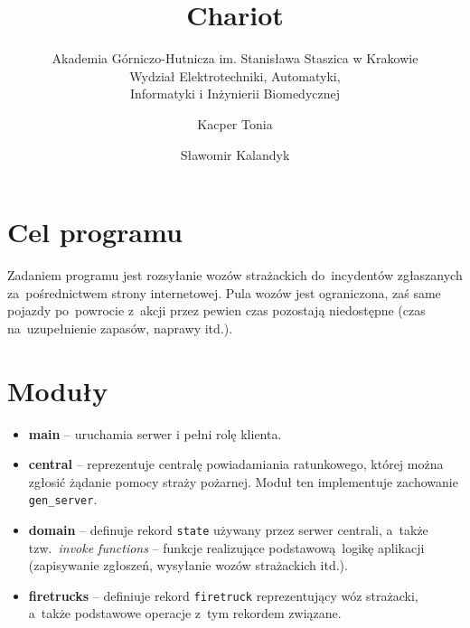 \documentclass{article}
\title{Chariot}
\subtitle{Akademia Górniczo-Hutnicza im. Stanisława Staszica w Krakowie\\
	Wydział Elektrotechniki, Automatyki,\\
	Informatyki i Inżynierii Biomedycznej}
\author{Kacper Tonia\and
		Sławomir Kalandyk}
\date{}
\begin{document}
\maketitle

\section{Cel programu}
Zadaniem programu jest rozsyłanie wozów strażackich do~incydentów zgłaszanych za~pośrednictwem strony internetowej. Pula wozów jest ograniczona, zaś same pojazdy po~powrocie z~akcji przez pewien czas pozostają niedostępne (czas na~uzupełnienie zapasów, naprawy itd.).
\section{Moduły}
\begin{itemize}
	\item \textbf{main} -- uruchamia serwer i pełni rolę klienta.
	\item \textbf{central} -- reprezentuje centralę powiadamiania ratunkowego, której można zgłosić żądanie pomocy straży pożarnej. Moduł ten implementuje zachowanie \texttt{gen\_server}.
	\item \textbf{domain} -- definuje rekord \texttt{state} używany przez serwer centrali, a~także tzw.~\emph{invoke functions} -- funkcje realizujące podstawową logikę aplikacji (zapisywanie zgłoszeń, wysyłanie wozów strażackich itd.).
	\item \textbf{firetrucks} -- definiuje rekord \texttt{firetruck} reprezentujący wóz strażacki, a~także podstawowe operacje z~tym rekordem związane.
\end{itemize}
\end{document}

